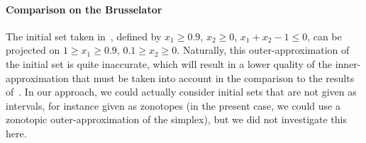 \paragraph{Comparison on the Brusselator}
The initial set taken in~\cite{Underapproxflowpipes}, defined by 
$x_1 \geq 0.9$, $x_2 \geq 0$, $x_1+x_2-1 \leq 0$, can be projected on $1 \geq x_1 \geq 0.9$, $0.1 \geq x_2 \geq 0$.
Naturally, this outer-approximation of the initial set is quite inaccurate, which will result in a lower quality of the inner-approximation
that must be taken into account in the comparison to the results of~\cite{Underapproxflowpipes}. In our approach, 
we could actually consider initial sets that are not given as intervals, for instance given as zonotopes 
(in the present case, we could use a zonotopic outer-approximation of the simplex),  
but we did not investigate this here. 

